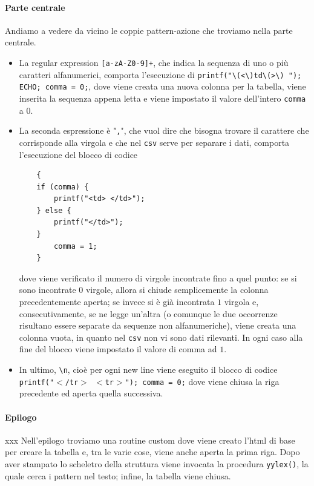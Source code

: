 \documentclass[class=book, crop=false, oneside, 12pt]{standalone}
\begin{document}
\paragraph{Parte centrale}
Andiamo a vedere da vicino le coppie pattern-azione che troviamo nella parte centrale.
\begin{itemize}
    \item La regular expression \texttt{[a-zA-Z0-9]+}, che indica la sequenza di uno o più caratteri alfanumerici, comporta l'esecuzione di \texttt{printf("\textbackslash(<\textbackslash)td\textbackslash(>\textbackslash) "); ECHO; comma = 0;}, dove viene creata una nuova colonna per la tabella, viene inserita la sequenza appena letta e viene impostato il valore dell'intero \texttt{comma} a \(0\).
    \item La seconda espressione è "\texttt{,}", che vuol dire che bisogna trovare il carattere che corrisponde alla virgola e che nel \texttt{csv} serve per separare i dati, comporta l'esecuzione del blocco di codice
    \begin{verbatim}
    {            
    if (comma) {
        printf("<td> </td>"); 
    } else { 
        printf("</td>");
    }       
        comma = 1;
    }
    \end{verbatim}
        
    dove viene verificato il numero di virgole incontrate fino a quel punto: se si sono incontrate 0 virgole, allora si chiude semplicemente la colonna precedentemente aperta; se invece si è già incontrata \(1\) virgola e, consecutivamente, se ne legge un'altra (o comunque le due occorrenze risultano essere separate da sequenze non alfanumeriche), viene creata una colonna vuota, in quanto nel \texttt{csv} non vi sono dati rilevanti. In ogni caso alla fine del blocco viene impostato il valore di comma ad \(1\).
    \item In ultimo, \texttt{\textbackslash n}, cioè per ogni new line viene eseguito il blocco di codice \texttt{{printf("\(<\)/tr\(>\) \n \(<\)tr\(>\)"); comma = 0;}} dove viene chiusa la riga precedente ed aperta quella successiva.
\end{itemize}

\paragraph{Epilogo}xxx
Nell'epilogo troviamo una routine custom dove viene creato l'html di base per creare la tabella e, tra le varie cose, viene anche aperta la prima riga. Dopo aver stampato lo scheletro della struttura viene invocata la procedura \texttt{yylex()}, la quale cerca i pattern nel testo; infine, la tabella viene chiusa.
\end{document}
